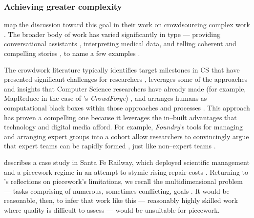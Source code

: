 \documentclass[trackingWork]{subfiles}
\begin{document}
\subsubsection[finding crowdwork's limits]{Achieving greater complexity}\label{sec:complexity}
\subsubsubsection{\crowdworkpers}
\citeauthor{crowdForgeKittur}
map the discussion toward this goal in their work on
crowdsourcing complex work
\cite{crowdForgeKittur}.
The broader body of work has varied significantly in type
--- providing conversational assistants%
, interpreting medical data, and
telling coherent and compelling stories%
, to name a few examples
\cite{Lasecki:2013:CCC:2501988.2502057,mavandadi2012distributed,KimStoria}.

The crowdwork literature typically identifies target milestones in CS 
that have presented significant challenges for researchers%
, leverages some of the approaches and insights that Computer Science researchers have already made
(for example, MapReduce in the case of \citeauthor{crowdForgeKittur}'s \textit{CrowdForge})%
, and arranges humans as computational black boxes within those approaches and processes
\cite[][and others]{crowdForgeKittur,foundry}.
This approach has proven a compelling one because
it leverages the in--built advantages that technology and digital media afford.
For example, \textit{Foundry}'s tools for managing and arranging expert groups into a cohort
allow researchers to convincingly argue that expert teams can be rapidly formed%
, just like non--expert teams
\cite{foundry}.



\subsubsubsection{\pieceworkpers}
\citeauthor{10.2307/23702539} describes a case study in Santa Fe Railway, which
deployed scientific management and a piecework regime in an attempt to stymie rising repair costs
\cite{10.2307/23702539}.
Returning to \citeauthor{hart2016rise}'s reflections on piecework's limitations,
we recall the multidimensional problem
--- tasks comprising of numerous, sometimes conflicting, goals
\cite{hart2016rise}.
It would be reasonable, then, to infer that work like this
--- reasonably highly skilled work where quality is difficult to assess ---
would be unsuitable for piecework. 
\end{document}
